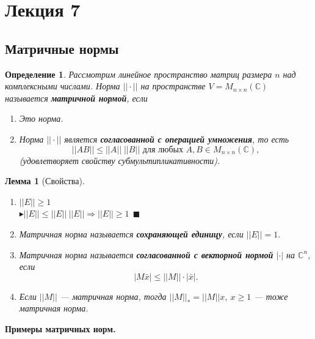 \documentclass[12pt]{article}
\newtheorem*{definition}{Определение}
\newtheorem*{lemma}{Лемма}
\begin{document}
	
	\newpage
	\section{Лекция 7}
	\subsection{Матричные нормы}
	\begin{definition}
		Рассмотрим линейное пространство матриц размера $n$ над комплексными числами. Норма $||\cdot||$ на пространстве $V=M_{n\times n}(\mathbb{C})$ называется \textbf{матричной нормой}, если \begin{enumerate}[start=0]
			\item Это норма.
			\item Норма $||\cdot ||$ является \textbf{согласованной с операцией умножения}, то есть $$||AB|| \leq ||A|| \; ||B|| \text{ для любых } A, B \in M_{n\times n}(\mathbb{C}),$$ (удовлетворяет свойству субмультипликативности).\end{enumerate}
	\end{definition}
	\begin{lemma}[Свойства]
		\ 
		\begin{enumerate}
			\item  $||E||\geqslant1$\\
			$\blacktriangleright ||E||\leqslant||E||~||E|| \Rightarrow ||E||\geqslant1~~\blacksquare$
			\item Матричная норма называется \textbf{сохраняющей единицу}, если $||E||=1.$
			\item Матричная норма называется \textbf{согласованной с векторной нормой} $|\cdot|$ на $\mathbb{C}^n$, если $$|M\bar x|\leqslant||M||\cdot |\bar x|.$$
			\item Если $||M||$ --- матричная норма, тогда $||M||_*=||M||x,~x\geqslant1$ --- тоже матричная норма.
		\end{enumerate}
	\end{lemma}
	\textbf{Примеры матричных норм.}
\end{document}

